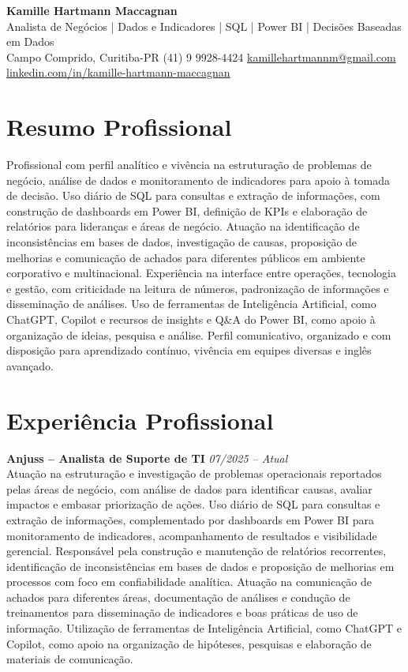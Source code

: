 \documentclass[11pt,a4paper]{article}
\newcommand{\cvheader}[4]{%
  \begin{center}
    {\LARGE\bfseries #1}\\[4pt]
    {\large #2}\\[6pt]
    #3\\[2pt]
    #4
  \end{center}
  \vspace{4pt}
}
\newcommand{\experience}[3]{%
  \textbf{#1} \hfill \textit{#2}\\[4pt]
  #3
  \vspace{8pt}
}
\begin{document}
\cvheader{Kamille Hartmann Maccagnan}%
{Analista de Negócios | Dados e Indicadores | SQL | Power BI | Decisões Baseadas em Dados}%
{Campo Comprido, Curitiba-PR \textbullet{} (41) 9 9928-4424 \textbullet{} \href{mailto:kamillehartmannm@gmail.com}{kamillehartmannm@gmail.com}}%
{\href{https://linkedin.com/in/kamille-hartmann-maccagnan/}{linkedin.com/in/kamille-hartmann-maccagnan}}

\section*{Resumo Profissional}

Profissional com perfil analítico e vivência na estruturação de problemas de negócio, análise de dados e monitoramento de indicadores para apoio à tomada de decisão. Uso diário de SQL para consultas e extração de informações, com construção de dashboards em Power BI, definição de KPIs e elaboração de relatórios para lideranças e áreas de negócio. Atuação na identificação de inconsistências em bases de dados, investigação de causas, proposição de melhorias e comunicação de achados para diferentes públicos em ambiente corporativo e multinacional. Experiência na interface entre operações, tecnologia e gestão, com criticidade na leitura de números, padronização de informações e disseminação de análises. Uso de ferramentas de Inteligência Artificial, como ChatGPT, Copilot e recursos de insights e Q\&A do Power BI, como apoio à organização de ideias, pesquisa e análise. Perfil comunicativo, organizado e com disposição para aprendizado contínuo, vivência em equipes diversas e inglês avançado.

\section*{Experiência Profissional}

\experience{Anjuss -- Analista de Suporte de TI}{07/2025 -- Atual}{%
Atuação na estruturação e investigação de problemas operacionais reportados pelas áreas de negócio, com análise de dados para identificar causas, avaliar impactos e embasar priorização de ações. Uso diário de SQL para consultas e extração de informações, complementado por dashboards em Power BI para monitoramento de indicadores, acompanhamento de resultados e visibilidade gerencial. Responsável pela construção e manutenção de relatórios recorrentes, identificação de inconsistências em bases de dados e proposição de melhorias em processos com foco em confiabilidade analítica. Atuação na comunicação de achados para diferentes áreas, documentação de análises e condução de treinamentos para disseminação de indicadores e boas práticas de uso de informação. Utilização de ferramentas de Inteligência Artificial, como ChatGPT e Copilot, como apoio na organização de hipóteses, pesquisas e elaboração de materiais de comunicação.}
\end{document}
